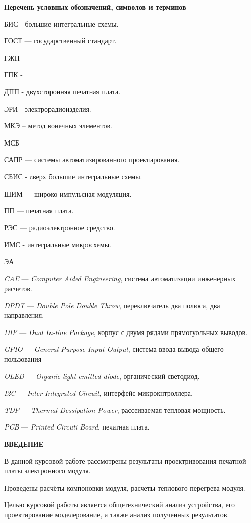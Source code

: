 \tableofcontents
\newpage
\begin{center}
\textbf{Перечень условных обозначений, символов и терминов}
\end{center}

БИС - большие интегральные схемы.

ГОСТ — государственный стандарт.

ГЖП -

ГПК -

ДПП - двухсторонняя печатная плата.

ЭРИ - электрорадиоизделия.

МКЭ – метод конечных элементов.

МСБ -

САПР — системы автоматизированного проектирования.

СБИС - cверх большие интегральные схемы.

ШИМ — широко импульсная модуляция.

ПП — печатная плата.

РЭС — радиоэлектронное средство.

ИМС - интегральные микросхемы.

ЭА

\textit{CAE} — \textit{Computer Aided Engineering}, система автоматизации инженерных расчетов.

\textit{DPDT} — \textit{Double Pole Double Throw}, переключатель два полюса, два направления.

\textit{DIP} — \textit{Dual In-line Package}, корпус с двумя рядами
прямогуольных выводов.

\textit{GPIO} — \textit{ General Purpose Input Output}, система ввода-вывода общего пользования

\textit{OLED} — \textit{Organic light emitted diode}, органический светодиод.

\textit{I2C} — \textit{Inter-Integrated Circuit}, интерфейс микрокнтроллера.

\textit{TDP} — \textit{Thermal Dessipation Power}, рассеиваемая тепловая мощность.

\textit{PCB} — \textit{Printed Circuti Board}, печатная плата.

\newpage

\begin{center}
\textbf{ВВЕДЕНИЕ}
\end{center}


В данной курсовой работе рассмотрены результаты проектривования 
печатной платы электронного модуля.

Проведены расчёты компоновки модуля, расчеты теплового перегрева
модуля.

Целью курсовой работы является общетехнический анализ устройства,
его проектирование моделерование, а также анализ полученных результатов.

\newpage
